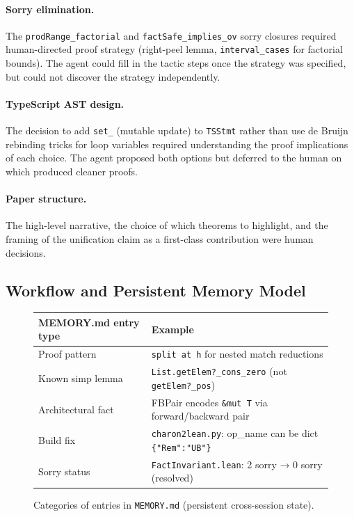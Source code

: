 \paragraph{Sorry elimination.}
The \texttt{prodRange\_factorial} and \texttt{factSafe\_implies\_ov}
sorry closures required human-directed proof strategy (right-peel lemma,
\texttt{interval\_cases} for factorial bounds).
The agent could fill in the tactic steps once the strategy was specified,
but could not discover the strategy independently.

\paragraph{TypeScript AST design.}
The decision to add \texttt{set\_} (mutable update) to \texttt{TSStmt}
rather than use de Bruijn rebinding tricks for loop variables required
understanding the proof implications of each choice.  The agent proposed
both options but deferred to the human on which produced cleaner proofs.

\paragraph{Paper structure.}
The high-level narrative, the choice of which theorems to highlight, and
the framing of the unification claim as a first-class contribution were
human decisions.

\subsection{Workflow and Persistent Memory Model}

\begin{figure}[h]
\centering
\small
\begin{tabular}{@{}ll@{}}
\toprule
\textbf{MEMORY.md entry type} & \textbf{Example} \\
\midrule
Proof pattern & \texttt{split at h} for nested match reductions \\
Known simp lemma & \texttt{List.getElem?\_cons\_zero} (not \texttt{getElem?\_pos}) \\
Architectural fact & FBPair encodes \texttt{\&mut T} via forward/backward pair \\
Build fix & \texttt{charon2lean.py}: op\_name can be dict \texttt{\{"Rem":"UB"\}} \\
Sorry status & \texttt{FactInvariant.lean}: 2 sorry → 0 sorry (resolved) \\
\bottomrule
\end{tabular}
\caption{Categories of entries in \texttt{MEMORY.md} (persistent cross-session state).}
\label{tab:memory}
\end{figure}

